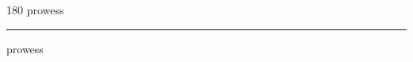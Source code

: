 
\begin{frame}
\begin{center}
\begin{turn}{180}
{\fontsize{2.5cm}{1em}\selectfont prowess}
\end{turn}
\vspace{1em}\par  
\hrule
\vspace{1em}\par  
{\fontsize{2.5cm}{1em}\selectfont prowess}
\end{center}
\end{frame}
